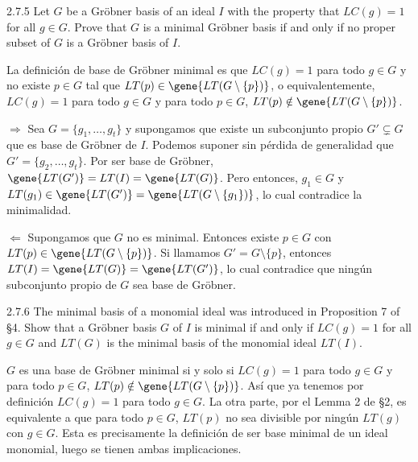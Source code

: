 \documentclass[twoside]{article}
\begin{document}
\begin{ejercicio}{2.7.5}
Let $G$ be a Gröbner basis of an ideal $I$ with the property that $LC (g) = 1$ for all $g ∈ G$.
Prove that $G$ is a minimal Gröbner basis if and only if no proper subset of $G$ is a Gröbner
basis of $I$.
\end{ejercicio}
\begin{solucion}
La definición de base de Gröbner minimal es que $LC (g) = 1$ para todo $g ∈ G$  y no existe $p\in G$ tal que $LT(p)\in\gene{LT(G\setminus\{p\})}$, o equivalentemente, $LC (g) = 1$ para todo $g ∈ G$ y para todo $p\in G$, $LT(p)\notin \gene{LT(G\setminus\{p\})}$.

$\boxed{\Rightarrow}$ Sea $G=\{g_1,\dots, g_t\}$ y supongamos que existe un subconjunto propio $G'\subsetneq G$ que es base de Gröbner de $I$. Podemos suponer sin pérdida de generalidad que $G'=\{g_2,\dots, g_t\}$. Por ser base de Gröbner, $\gene{LT(G')}=LT(I)=\gene{LT(G)}$. Pero entonces, $g_1\in G$ y $LT(g_1)\in \gene{LT(G')}=\gene{LT(G\setminus\{g_1\})}$, lo cual contradice la minimalidad.

$\boxed{\Leftarrow}$ Supongamos que $G$ no es minimal. Entonces existe $p\in G$ con $LT(p)\in\gene{LT(G\setminus\{p\})}$. Si llamamos $G'=G\setminus\{p\}$, entonces $LT(I)=\gene{LT(G)}=\gene{LT(G')}$, lo cual contradice que ningún subconjunto propio de $G$ sea base de Gröbner.
\end{solucion}

\newpage

\begin{ejercicio}{2.7.6}
The minimal basis of a monomial ideal was introduced in Proposition 7 of §4. Show that
a Gröbner basis $G$ of $I$ is minimal if and only if $LC (g) = 1$ for all $g ∈ G$ and $LT (G)$ is
the minimal basis of the monomial ideal $LT (I)$.
\end{ejercicio}
\begin{solucion}
$G$ es una base de Gröbner minimal si y solo si $LC (g) = 1$ para todo $g ∈ G$  y para todo $p\in G$, $LT(p)\notin \gene{LT(G\setminus\{p\})}$. Así que ya tenemos por definición $LC(g)=1$ para todo $g\in G$. La otra parte, por el Lemma 2 de §2, es equivalente a que para todo $p\in G$, $LT(p)$ no sea divisible por ningún $LT(g)$ con $g\in G$. Esta es precisamente la definición de ser base minimal de un ideal monomial, luego se tienen ambas implicaciones.
\end{solucion}

\newpage
\end{document}
